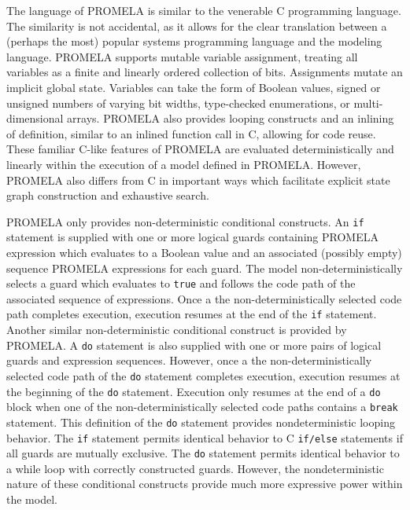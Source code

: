 The language of PROMELA is similar to the venerable C programming language.
The similarity is not accidental, as it allows for the clear translation between a (perhaps the most) popular systems programming language and the modeling language.
PROMELA supports mutable variable assignment, treating all variables as a finite and linearly ordered collection of bits.
Assignments mutate an implicit global state.
Variables can take the form of Boolean values, signed or unsigned numbers of varying bit widths, type-checked enumerations, or multi-dimensional arrays.
PROMELA also provides looping constructs and an inlining of definition, similar to an inlined function call in C, allowing for code reuse.
These familiar C-like features of PROMELA are evaluated deterministically and linearly within the execution of a model defined in PROMELA.
However, PROMELA also differs from C in important ways which facilitate explicit state graph construction and exhaustive search.

PROMELA only provides non-deterministic conditional constructs.
An \texttt{if} statement is supplied with one or more logical guards containing PROMELA expression which evaluates to a Boolean value and an associated (possibly empty) sequence PROMELA expressions for each guard.
The model non-deterministically selects a guard which evaluates to \texttt{true} and follows the code path of the associated sequence of expressions.
Once a the non-deterministically selected code path completes execution, execution resumes at the end of the \texttt{if} statement.
Another similar non-deterministic conditional construct is provided by PROMELA.
A \texttt{do} statement is also supplied with one or more pairs of logical guards and expression sequences.
However, once a the non-deterministically selected code path of the \texttt{do} statement completes execution, execution resumes at the beginning of the \texttt{do} statement.
Execution only resumes at the end of a \texttt{do} block when one of the non-deterministically selected code paths contains a \texttt{break} statement.
This definition of the \texttt{do} statement provides nondeterministic looping behavior.
The \texttt{if} statement permits identical behavior to C \texttt{if/else} statements if all guards are mutually exclusive.
The \texttt{do} statement permits identical behavior to a while loop with correctly constructed guards.
However, the nondeterministic nature of these conditional constructs provide much more expressive power within the model.

